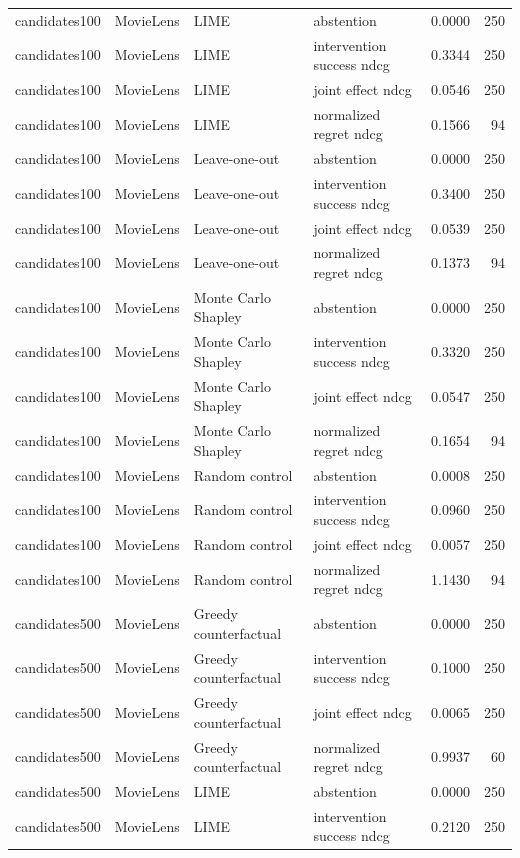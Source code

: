 \begin{longtable}{@{}p{}p{}p{}p{}rr@{}}
candidates100 & MovieLens & LIME & abstention & 0.0000 & 250 \\
candidates100 & MovieLens & LIME & intervention success ndcg & 0.3344 & 250 \\
candidates100 & MovieLens & LIME & joint effect ndcg & 0.0546 & 250 \\
candidates100 & MovieLens & LIME & normalized regret ndcg & 0.1566 & 94 \\
candidates100 & MovieLens & Leave-one-out & abstention & 0.0000 & 250 \\
candidates100 & MovieLens & Leave-one-out & intervention success ndcg & 0.3400 & 250 \\
candidates100 & MovieLens & Leave-one-out & joint effect ndcg & 0.0539 & 250 \\
candidates100 & MovieLens & Leave-one-out & normalized regret ndcg & 0.1373 & 94 \\
candidates100 & MovieLens & Monte Carlo Shapley & abstention & 0.0000 & 250 \\
candidates100 & MovieLens & Monte Carlo Shapley & intervention success ndcg & 0.3320 & 250 \\
candidates100 & MovieLens & Monte Carlo Shapley & joint effect ndcg & 0.0547 & 250 \\
candidates100 & MovieLens & Monte Carlo Shapley & normalized regret ndcg & 0.1654 & 94 \\
candidates100 & MovieLens & Random control & abstention & 0.0008 & 250 \\
candidates100 & MovieLens & Random control & intervention success ndcg & 0.0960 & 250 \\
candidates100 & MovieLens & Random control & joint effect ndcg & 0.0057 & 250 \\
candidates100 & MovieLens & Random control & normalized regret ndcg & 1.1430 & 94 \\
candidates500 & MovieLens & Greedy counterfactual & abstention & 0.0000 & 250 \\
candidates500 & MovieLens & Greedy counterfactual & intervention success ndcg & 0.1000 & 250 \\
candidates500 & MovieLens & Greedy counterfactual & joint effect ndcg & 0.0065 & 250 \\
candidates500 & MovieLens & Greedy counterfactual & normalized regret ndcg & 0.9937 & 60 \\
candidates500 & MovieLens & LIME & abstention & 0.0000 & 250 \\
candidates500 & MovieLens & LIME & intervention success ndcg & 0.2120 & 250 \\

\end{longtable}

